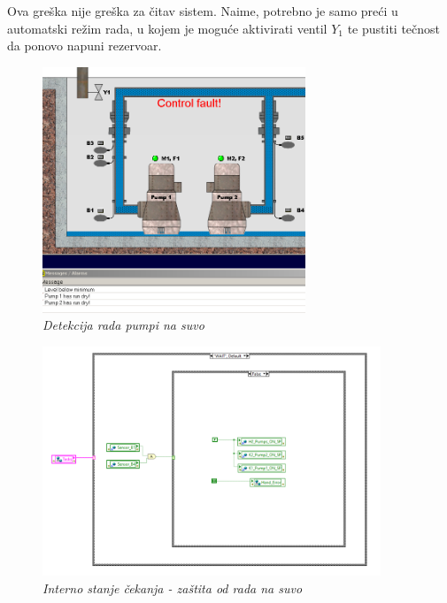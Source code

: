 \documentclass[12pt, titlepage]{article}
\begin{document}
                Ova greška nije greška za čitav sistem. Naime, potrebno je samo preći u automatski režim rada,
                u kojem je moguće aktivirati ventil $Y_1$ te pustiti tečnost da ponovo napuni rezervoar.

                \begin{figure}[ht]
                    \centering
                    \includegraphics[width=0.7\textwidth]{Slike/HAND DRY PUMPS.PNG}
                    \caption{\textit{Detekcija rada pumpi na suvo}}
                \end{figure}

                \begin{figure}[ht]
                    \centering
                    \includegraphics[width=0.9\textwidth]{Slike/HAND_AUTO.vi WAIT.png}
                    \caption{\textit{Interno stanje čekanja - zaštita od rada na suvo}}
                \end{figure}
\end{document}
